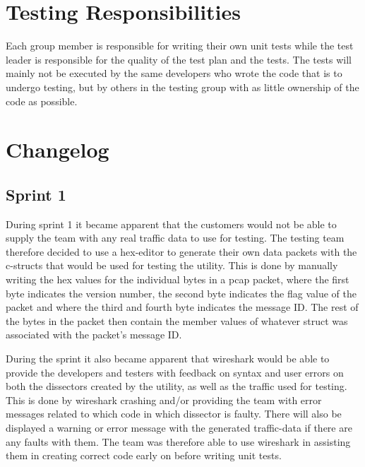 \section{Testing Responsibilities}
Each group member is responsible for writing their own unit tests while the test leader is responsible for the quality of the test plan and the tests. The tests will mainly not be executed by the same developers who wrote the code that is to undergo testing, but by others in the testing group with as little ownership of the code as possible. 

\section{Changelog}

\subsection{Sprint 1}
During sprint 1 it became apparent that the customers would not be able to supply the team with any real traffic data to use for testing. The testing team therefore decided to use a hex-editor to generate their own data \glspl{packet} with the \Gls{c}-\glspl{struct} that would be used for testing the \gls{utility}. This is done by manually writing the hex values for the individual bytes in a pcap \gls{packet}, where the first byte indicates the version number, the second byte indicates the flag value of the \gls{packet} and where the third and fourth byte indicates the message ID. The rest of the bytes in the \gls{packet} then contain the \gls{member} values of whatever \gls{struct} was associated with the \gls{packet}'s message ID.

During the sprint it also became apparent that \Gls{wireshark} would be able to provide the developers and testers with feedback on syntax and user errors on both the \glspl{dissector} created by the \gls{utility}, as well as the traffic used for testing. This is done by \Gls{wireshark} crashing and/or providing the team with error messages related to which code in which \gls{dissector} is faulty. There will also be displayed a warning or error message with the generated traffic-data if there are any faults with them. The team was therefore able to use \Gls{wireshark} in assisting them in creating correct code early on before writing unit tests.   

